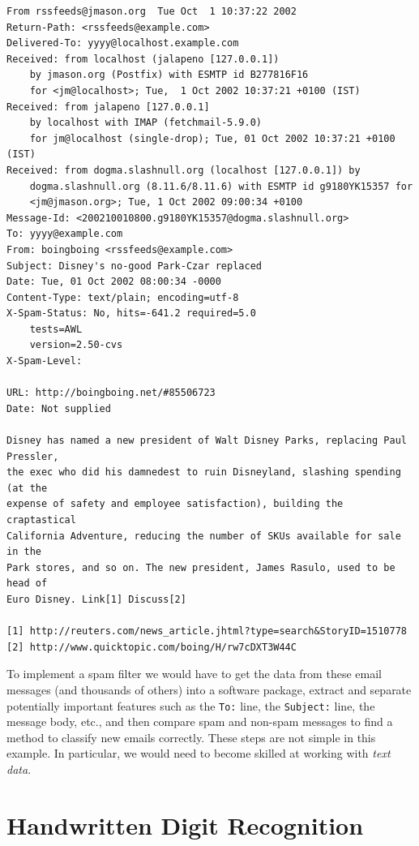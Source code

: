 \documentclass[]{krantz}
\begin{document}
\begin{verbatim}
From rssfeeds@jmason.org  Tue Oct  1 10:37:22 2002
Return-Path: <rssfeeds@example.com>
Delivered-To: yyyy@localhost.example.com
Received: from localhost (jalapeno [127.0.0.1])
    by jmason.org (Postfix) with ESMTP id B277816F16
    for <jm@localhost>; Tue,  1 Oct 2002 10:37:21 +0100 (IST)
Received: from jalapeno [127.0.0.1]
    by localhost with IMAP (fetchmail-5.9.0)
    for jm@localhost (single-drop); Tue, 01 Oct 2002 10:37:21 +0100 (IST)
Received: from dogma.slashnull.org (localhost [127.0.0.1]) by
    dogma.slashnull.org (8.11.6/8.11.6) with ESMTP id g9180YK15357 for
    <jm@jmason.org>; Tue, 1 Oct 2002 09:00:34 +0100
Message-Id: <200210010800.g9180YK15357@dogma.slashnull.org>
To: yyyy@example.com
From: boingboing <rssfeeds@example.com>
Subject: Disney's no-good Park-Czar replaced
Date: Tue, 01 Oct 2002 08:00:34 -0000
Content-Type: text/plain; encoding=utf-8
X-Spam-Status: No, hits=-641.2 required=5.0
    tests=AWL
    version=2.50-cvs
X-Spam-Level: 

URL: http://boingboing.net/#85506723
Date: Not supplied

Disney has named a new president of Walt Disney Parks, replacing Paul Pressler, 
the exec who did his damnedest to ruin Disneyland, slashing spending (at the 
expense of safety and employee satisfaction), building the craptastical 
California Adventure, reducing the number of SKUs available for sale in the 
Park stores, and so on. The new president, James Rasulo, used to be head of 
Euro Disney. Link[1] Discuss[2]

[1] http://reuters.com/news_article.jhtml?type=search&StoryID=1510778
[2] http://www.quicktopic.com/boing/H/rw7cDXT3W44C
\end{verbatim}

To implement a spam filter we would have to get the data from these
email messages (and thousands of others) into a software package,
extract and separate potentially important features such as the
\texttt{To:} line, the \texttt{Subject:} line, the message body, etc.,
and then compare spam and non-spam messages to find a method to classify
new emails correctly. These steps are not simple in this example. In
particular, we would need to become skilled at working with \emph{text
data}.

\section{Handwritten Digit
Recognition}\label{handwritten-digit-recognition}
\end{document}
